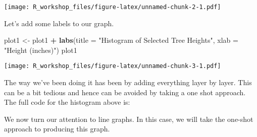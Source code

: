 \documentclass[]{article}
\newenvironment{Shaded}{\begin{snugshade}}{\end{snugshade}}
\newcommand{\DataTypeTok}[1]{\textcolor[rgb]{0.13,0.29,0.53}{#1}}
\newcommand{\DecValTok}[1]{\textcolor[rgb]{0.00,0.00,0.81}{#1}}
\newcommand{\FloatTok}[1]{\textcolor[rgb]{0.00,0.00,0.81}{#1}}
\newcommand{\KeywordTok}[1]{\textcolor[rgb]{0.13,0.29,0.53}{\textbf{#1}}}
\newcommand{\NormalTok}[1]{#1}
\newcommand{\OperatorTok}[1]{\textcolor[rgb]{0.81,0.36,0.00}{\textbf{#1}}}
\newcommand{\StringTok}[1]{\textcolor[rgb]{0.31,0.60,0.02}{#1}}
\begin{document}
\texttt{[image: R\_workshop\_files/figure-latex/unnamed-chunk-2-1.pdf]}

Let's add some labels to our graph.

\begin{Shaded}
\begin{Highlighting}[]
\NormalTok{plot1 <-}\StringTok{ }\NormalTok{plot1 }\OperatorTok{+}\StringTok{ }\KeywordTok{labs}\NormalTok{(}\DataTypeTok{title =} \StringTok{"Histogram of Selected Tree Heights"}\NormalTok{,}
  \DataTypeTok{xlab =} \StringTok{"Height (inches)"}\NormalTok{)}
\NormalTok{plot1}
\end{Highlighting}
\end{Shaded}

\texttt{[image: R\_workshop\_files/figure-latex/unnamed-chunk-3-1.pdf]}

The way we've been doing it has been by adding everything layer by
layer. This can be a bit tedious and hence can be avoided by taking a
one shot approach. The full code for the histogram above is:

\begin{Shaded}
\end{Shaded}

We now turn our attention to line graphs. In this case, we will take the
one-shot approach to producing this graph.
\end{document}
